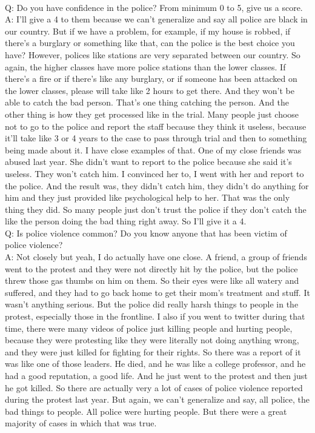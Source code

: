 \documentclass{phyasgn}\usepackage{nag}
\begin{document}
\\
Q: Do you have confidence in the police? From minimum 0 to 5, give us a score. \\
A: I'll give a 4 to them because we can't generalize and say all police are black in our country. But if we have a problem, for example, if my house is robbed, if there's a burglary or something like that, can the police is the best choice you have? However, polices like stations are very separated between our country. So again, the higher classes have more police stations than the lower classes. If there's a fire or if there's like any burglary, or if someone has been attacked on the lower classes, please will take like 2 hours to get there. And they won't be able to catch the bad person. That's one thing catching the person. And the other thing is how they get processed like in the trial. Many people just choose not to go to the police and report the staff because they think it useless, because it'll take like 3 or 4 years to the case to pass through trial and then to something being made about it. I have close examples of that. One of my close friends was abused last year. She didn't want to report to the police because she said it's useless. They won't catch him. I convinced her to, I went with her and report to the police. And the result was, they didn't catch him, they didn't do anything for him and they just provided like psychological help to her. That was the only thing they did. So many people just don't trust the police if they don't catch the like the person doing the bad thing right away. So I'll give it a 4.\\
Q: Is police violence common? Do you know anyone that has been victim of police violence? \\
A: Not closely but yeah, I do actually have one close. A friend, a group of friends went to the protest and they were not directly hit by the police, but the police threw those gas thumbs on him on them. So their eyes were like all watery and suffered, and they had to go back home to get their mom's treatment and stuff. It wasn't anything serious. But the police did really harsh things to people in the protest, especially those in the frontline. I also if you went to twitter during that time, there were many videos of police just killing people and hurting people, because they were protesting like they were literally not doing anything wrong, and they were just killed for fighting for their rights. So there was a report of it was like one of those leaders. He died, and he was like a college professor, and he had a good reputation, a good life. And he just went to the protest and then just he got killed. So there are actually very a lot of cases of police violence reported during the protest last year. But again, we can’t generalize and say, all police, the bad things to people. All police were hurting people. But there were a great majority of cases in which that was true.\\
\end{document}
